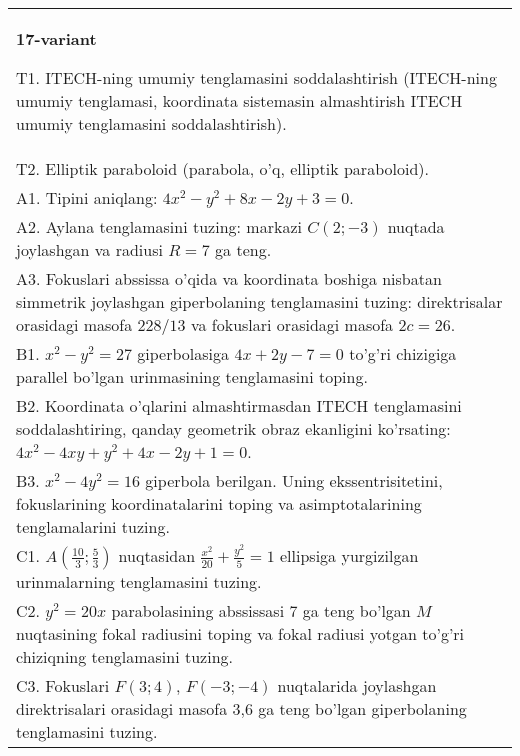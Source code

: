 \documentclass{article}
\begin{document}
\begin{tabular}{m{17cm}}
\textbf{17-variant}
\newline

T1. ITECH-ning umumiy tenglamasini soddalashtirish (ITECH-ning umumiy tenglamasi, koordinata sistemasin almashtirish ITECH umumiy tenglamasini soddalashtirish).\\

T2. Elliptik paraboloid (parabola, o'q, elliptik paraboloid).\\

A1. Tipini aniqlang: $4x^{2}-y^{2}+8x-2y+3=0$.\\

A2. Aylana tenglamasini tuzing: markazi $C(2;-3)$ nuqtada joylashgan va radiusi $R=7$ ga teng.\\

A3. Fokuslari abssissa o'qida va koordinata boshiga nisbatan simmetrik joylashgan giperbolaning tenglamasini tuzing: direktrisalar orasidagi masofa $228/13$ va fokuslari orasidagi masofa $2c=26$.\\

B1. $x^{2} - y^{2} = 27$ giperbolasiga $4x + 2y - 7 = 0$ to'g'ri chizigiga parallel bo'lgan urinmasining tenglamasini toping.  \\

B2. Koordinata o'qlarini almashtirmasdan ITECH tenglamasini soddalashtiring, qanday geometrik obraz ekanligini ko'rsating: $4x^{2} - 4xy + y^{2} + 4x - 2y + 1 = 0$.  \\

B3. $x^{2} - 4y^{2} = 16$ giperbola berilgan. Uning ekssentrisitetini, fokuslarining koordinatalarini toping va asimptotalarining tenglamalarini tuzing.\\

C1. $A(\frac{10}{3};\frac{5}{3})$ nuqtasidan $\frac{x^{2}}{20} + \frac{y^{2}}{5} = 1$ ellipsiga yurgizilgan urinmalarning tenglamasini tuzing.  \\

C2. $y^{2} = 20x$ parabolasining abssissasi 7 ga teng bo'lgan $M$ nuqtasining fokal radiusini toping va fokal radiusi yotgan to'g'ri chiziqning tenglamasini tuzing.  \\

C3. Fokuslari $F(3;4)$, $F(-3;-4)$ nuqtalarida joylashgan direktrisalari orasidagi masofa 3,6 ga teng bo'lgan giperbolaning tenglamasini tuzing.  \\

\end{tabular}
\vspace{1cm}
\end{document}
